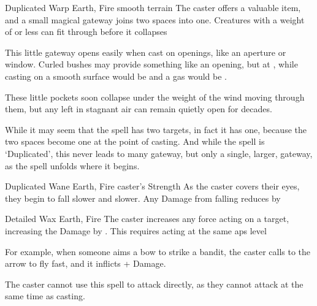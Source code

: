 \ifodd\value{diceNo}

  {Duplicated}%
  {Warp}%
  {Earth, Fire}%
  {smooth terrain}%
  {The caster offers a valuable item, and a small magical gateway joins two spaces into one.
  Creatures with a \gls{weight} of  or less can fit through before it collapses}%
  {This little gateway opens easily when cast on openings, like an aperture or window.
  Curled bushes may provide something like an opening, but at \tn[10], while casting on a smooth surface would be \tn[14] and a gas would be \tn[16].

  These little pockets soon collapse under the weight of the wind moving through them, but any left in stagnant air can remain quietly open for decades.

  While it may seem that the spell has two targets, in fact it has one, because the two spaces become one at the point of casting.
  And while the spell is `Duplicated', this never leads to many gateway, but only a single, larger, gateway, as the spell unfolds where it begins.}

  {Duplicated}%
  {Wane}%
  {Earth, Fire}%
  {caster's Strength}%
  {As the caster covers their eyes, they begin to fall slower and slower.
  Any Damage from falling reduces by }%
  {}

\else

  {Detailed}%
  {Wax}%
  {Earth, Fire}%
  {}%
  {The caster increases any force acting on a target, increasing the Damage by .
  This requires acting at the same \glspl{ap} level}%
  {For example, when someone aims a bow to strike a bandit, the caster calls to the arrow to fly fast, and it inflicts + Damage.

    The caster cannot use this spell to attack directly, as they cannot attack at the same time as casting.}

\fi

